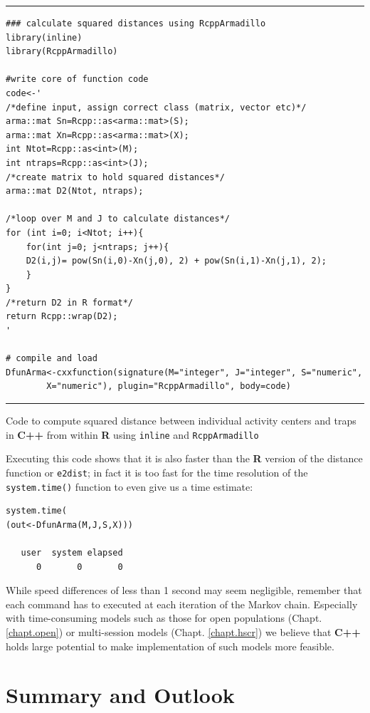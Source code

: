 \begin{panel}[ht]
\centering
\rule[0.15in]{\textwidth}{.03in}
{\small
\begin{verbatim}
### calculate squared distances using RcppArmadillo
library(inline)
library(RcppArmadillo)

#write core of function code
code<-'
/*define input, assign correct class (matrix, vector etc)*/
arma::mat Sn=Rcpp::as<arma::mat>(S);
arma::mat Xn=Rcpp::as<arma::mat>(X);
int Ntot=Rcpp::as<int>(M);
int ntraps=Rcpp::as<int>(J);
/*create matrix to hold squared distances*/
arma::mat D2(Ntot, ntraps);

/*loop over M and J to calculate distances*/
for (int i=0; i<Ntot; i++){
	for(int j=0; j<ntraps; j++){
	D2(i,j)= pow(Sn(i,0)-Xn(j,0), 2) + pow(Sn(i,1)-Xn(j,1), 2);
	}
}
/*return D2 in R format*/
return Rcpp::wrap(D2);
'

# compile and load
DfunArma<-cxxfunction(signature(M="integer", J="integer", S="numeric",
		X="numeric"), plugin="RcppArmadillo", body=code)
\end{verbatim}
}
\rule[-0.15in]{\textwidth}{.03in}
\caption{
Code to compute squared distance between individual activity centers and traps in {\bf C++} from within {\bf R} using {\tt inline} and {\tt RcppArmadillo}
}
\label{mcmc.panel.C1}
\end{panel}

Executing this code shows that it is also faster than the {\bf R} version of the distance function or {\tt e2dist}; in fact it is too fast for the time resolution of the {\tt system.time()} function to even give us a time estimate:
{\small
\begin{verbatim}
system.time(
(out<-DfunArma(M,J,S,X)))

   user  system elapsed 
      0       0       0 
\end{verbatim}
}
While speed differences of less than 1 second may seem negligible,
remember that each command has to executed at each iteration of the Markov chain. Especially with time-consuming models such as those for open populations (Chapt. \ref{chapt.open}) or multi-session models (Chapt. \ref{chapt.hscr}) we believe that {\bf C++} holds large potential to make implementation of such models more feasible.





\section{Summary and Outlook}

